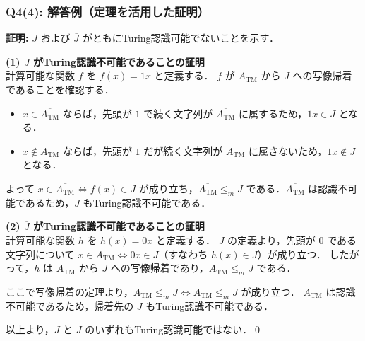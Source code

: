 \begin{frame}
\frametitle{Q4(4): 解答例（定理を活用した証明）}

\textbf{証明:} $J$ および $\overline{J}$ がともにTuring認識可能でないことを示す．

\vspace{0.5em}
\textbf{(1) $J$ がTuring認識不可能であることの証明} \\
計算可能な関数 $f$ を $f(x) = 1x$ と定義する．
$f$ が $\overline{A_{\mathrm{TM}}}$ から $J$ への写像帰着であることを確認する．
\begin{itemize}
    \item $x \in \overline{A_{\mathrm{TM}}}$ ならば，先頭が $1$ で続く文字列が $\overline{A_{\mathrm{TM}}}$ に属するため，$1x \in J$ となる．
    \item $x \notin \overline{A_{\mathrm{TM}}}$ ならば，先頭が $1$ だが続く文字列が $\overline{A_{\mathrm{TM}}}$ に属さないため，$1x \notin J$ となる．
\end{itemize}
よって $x \in \overline{A_{\mathrm{TM}}} \iff f(x) \in J$ が成り立ち，$\overline{A_{\mathrm{TM}}} \le_m J$ である．$\overline{A_{\mathrm{TM}}}$ は認識不可能であるため，$J$ もTuring認識不可能である．

\framebreak

\textbf{(2) $\overline{J}$ がTuring認識不可能であることの証明} \\
計算可能な関数 $h$ を $h(x) = 0x$ と定義する．
$J$ の定義より，先頭が $0$ である文字列について $x \in A_{\mathrm{TM}} \iff 0x \in J$（すなわち $h(x) \in J$）が成り立つ．
したがって，$h$ は $A_{\mathrm{TM}}$ から $J$ への写像帰着であり，$A_{\mathrm{TM}} \le_m J$ である．

ここで写像帰着の定理より，$A_{\mathrm{TM}} \le_m J \iff \overline{A_{\mathrm{TM}}} \le_m \overline{J}$ が成り立つ．
$\overline{A_{\mathrm{TM}}}$ は認識不可能であるため，帰着先の $\overline{J}$ もTuring認識不可能である．

\vspace{1em}
以上より，$J$ と $\overline{J}$ のいずれもTuring認識可能ではない．\qed
\end{frame}

